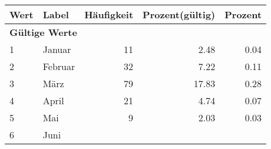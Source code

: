      \begin{longtable}{lXrrr}
     \toprule
     \textbf{Wert} & \textbf{Label} & \textbf{Häufigkeit} & \textbf{Prozent(gültig)} & \textbf{Prozent} \\
     \endhead
     \midrule
     \multicolumn{5}{l}{\textbf{Gültige Werte}}\\

     1 &
     \multicolumn{1}{X}{ Januar   } &


       \num{11} &
       \num[round-mode=places,round-precision=2]{2.48} &
         \num[round-mode=places,round-precision=2]{0.04} \\

     2 &
     \multicolumn{1}{X}{ Februar   } &


       \num{32} &
       \num[round-mode=places,round-precision=2]{7.22} &
         \num[round-mode=places,round-precision=2]{0.11} \\

     3 &
     \multicolumn{1}{X}{ März   } &


       \num{79} &
       \num[round-mode=places,round-precision=2]{17.83} &
         \num[round-mode=places,round-precision=2]{0.28} \\

     4 &
     \multicolumn{1}{X}{ April   } &


       \num{21} &
       \num[round-mode=places,round-precision=2]{4.74} &
         \num[round-mode=places,round-precision=2]{0.07} \\

     5 &
     \multicolumn{1}{X}{ Mai   } &


       \num{9} &
       \num[round-mode=places,round-precision=2]{2.03} &
         \num[round-mode=places,round-precision=2]{0.03} \\

     6 &
     \multicolumn{1}{X}{ Juni   } &



\end{longtable}
